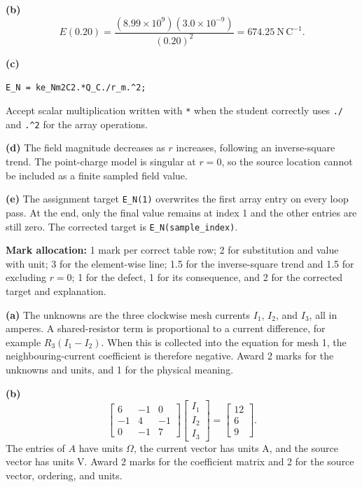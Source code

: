 \documentclass[11pt,a4paper]{article}
\newcommand{\questiontitle}[1]{\vspace{5pt}{\large\color{navy}\textbf{#1}}\par\vspace{2pt}}
\begin{document}
\textbf{(b)}
\[
  E(0.20)=\frac{(8.99\times10^9)(3.0\times10^{-9})}{(0.20)^2}
  =674.25\ \mathrm{N\,C^{-1}}.
\]

\textbf{(c)}
\begin{lstlisting}
E_N = ke_Nm2C2.*Q_C./r_m.^2;
\end{lstlisting}
Accept scalar multiplication written with \texttt{*} when the student correctly uses \texttt{./} and \texttt{.\textasciicircum2} for the array operations.

\textbf{(d)} The field magnitude decreases as \(r\) increases, following an inverse-square trend. The point-charge model is singular at \(r=0\), so the source location cannot be included as a finite sampled field value.

\textbf{(e)} The assignment target \texttt{E\_N(1)} overwrites the first array entry on every loop pass. At the end, only the final value remains at index 1 and the other entries are still zero. The corrected target is \texttt{E\_N(sample\_index)}.

\textbf{Mark allocation:} 1 mark per correct table row; 2 for substitution and value with unit; 3 for the element-wise line; 1.5 for the inverse-square trend and 1.5 for excluding \(r=0\); 1 for the defect, 1 for its consequence, and 2 for the corrected target and explanation.

\questiontitle{Question 2 - 16 marks}

\textbf{(a)} The unknowns are the three clockwise mesh currents \(I_1\), \(I_2\), and \(I_3\), all in amperes. A shared-resistor term is proportional to a current difference, for example \(R_3(I_1-I_2)\). When this is collected into the equation for mesh 1, the neighbouring-current coefficient is therefore negative. Award 2 marks for the unknowns and units, and 1 for the physical meaning.

\textbf{(b)}
\[
  \begin{bmatrix}6&-1&0\\-1&4&-1\\0&-1&7\end{bmatrix}
  \begin{bmatrix}I_1\\I_2\\I_3\end{bmatrix}
  =\begin{bmatrix}12\\6\\9\end{bmatrix}.
\]
The entries of \(A\) have units \(\Omega\), the current vector has units \(\mathrm{A}\), and the source vector has units \(\mathrm{V}\). Award 2 marks for the coefficient matrix and 2 for the source vector, ordering, and units.
\end{document}
